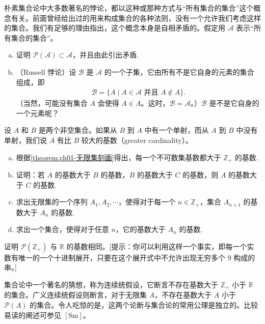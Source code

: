 \documentclass[../../main.tex]{subfiles}
\begin{document}
\begin{exercise}\label{exercise:ch01-选择公理-6}
朴素集合论中大多数著名的悖论，都以这种或那种方式与“所有集合的集合”这个概念有关。前面曾经给出过的用来构成集合的各种法则，没有一个允许我们考虑这样的集合。我们有足够的理由指出，这个概念本身是自相矛盾的。假定用 $\mathcal{A}$ 表示“所有集合的集合”。
\begin{enumerate}[(a)]
\item 证明 $\mathcal{P}(\mathcal{A}) \subset \mathcal{A}$，并且由此引出矛盾.
\item （Russell 悖论）设 $\mathcal{B}$ 是 $\mathcal{A}$ 的一个子集，它由所有不是它自身的元素的集合组成，即
\begin{align*}
\mathcal{B} = \{A \mid A \in \mathcal{A} \text{ 并且 } A \notin A\}.
\end{align*}
（当然，可能没有集合 $A$ 会使得 $A \in A$。这时，$\mathcal{B} = \mathcal{A}$。）$\mathcal{B}$ 是不是它自身的一个元素呢？
\end{enumerate}
\end{exercise}

\begin{exercise}\label{exercise:ch01-选择公理-7}
设 $A$ 和 $B$ 是两个非空集合。如果从 $B$ 到 $A$ 中有一个单射，而从 $A$ 到 $B$ 中没有单射，我们说 $A$ 有比 $B$ 较大的基数（greater cardinality）。
\begin{enumerate}[(a)]
\item 根据\cref{theorem:ch01-无限集刻画}得出，每一个不可数集基数都大于 $\mathbb{Z}_{+}$ 的基数.
\item 证明：若 $A$ 的基数大于 $B$ 的基数，$B$ 的基数大于 $C$ 的基数，则 $A$ 的基数大于 $C$ 的基数.
\item 求出无限集的一个序列 $A_{1}, A_{2}, \cdots$，使得对于每一个 $n \in \mathbb{Z}_{+}$，集合 $A_{n+1}$ 的基数大于 $A_{n}$ 的基数.
\item 求出一个集合，使得对于任意 $n$，它的基数大于 $A_{n}$ 的基数.
\end{enumerate}
\end{exercise}

\begin{exercise}\label{exercise:ch01-选择公理-8}
证明 $\mathcal{P}(\mathbb{Z}_{+})$ 与 $\mathbb{R}$ 的基数相同。[提示：你可以利用这样一个事实，即每一个实数有唯一的一个十进制展开，只要在这个展开式中不允许出现无穷多个 $9$ 构成的串。]

集合论中一个著名的猜想，称为连续统假设，它断言不存在基数大于 $\mathbb{Z}_{+}$ 小于 $\mathbb{R}$ 的集合。广义连续统假设则断言，对于无限集 $A$，不存在基数大于 $A$ 小于 $\mathcal{P}(A)$ 的集合。令人吃惊的是，这两个论断与集合论的常用公理是独立的。比较易读的阐述可参见 $[\mathrm{Sm}]$。
\end{exercise}
\end{document}
